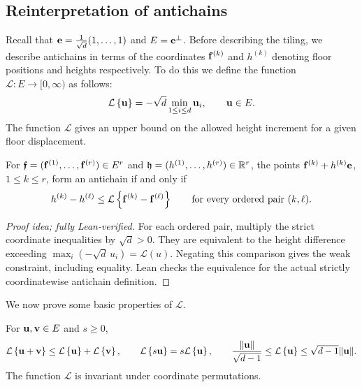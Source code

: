 \documentclass[11pt,letterpaper]{article}
\begin{document}
\subsection{Reinterpretation of antichains}
Recall that $\mathbf e=\frac{1}{\sqrt d}(1,\ldots,1)$ and $E=\mathbf e^\perp$.
Before describing the tiling, we describe antichains in terms of the coordinates $\mathbf f^{(k)}$ and $h^{(k)}$ denoting floor positions and heights respectively. To do this we define the function $\mathcal L:E\to[0,\infty)$ as follows:
\[
      \mathcal L\left\{\mathbf u\right\}=-\sqrt d\min_{1\le i\le d}\mathbf u_i, \qquad  \mathbf u\in E.
\]
The function $\mathcal L$ gives an upper bound on the allowed height increment for a given floor displacement.


\begin{proposition} \label{prop:L_definition}
      For $\bm{\mathfrak f}=(\mathbf f^{(1)},\ldots,\mathbf f^{(r)})\in E^r$ and $\mathfrak h=(h^{(1)},\ldots,h^{(r)})\in\mathbb R^r$, the points $\mathbf f^{(k)}+h^{(k)}\mathbf e$, $1\le k\le r$, form an antichain if and only if
      \begin{equation}\label{eq:constraints}
            h^{(k)}-h^{(\ell)}\le\mathcal L\left\{\mathbf f^{(k)}-\mathbf f^{(\ell)}\right\} \qquad\text{for every ordered pair }(k,\ell).
      \end{equation}
\end{proposition}

\begin{proof}[Proof idea; fully Lean-verified]
For each ordered pair, multiply the strict coordinate inequalities by $\sqrt d>0$. They are equivalent to the height difference exceeding $\max_i(-\sqrt d\,u_i)=\mathcal L(u)$. Negating this comparison gives the weak constraint, including equality. Lean checks the equivalence for the actual strictly coordinatewise antichain definition.
\end{proof}

We now prove some basic properties of $\mathcal L$.

\begin{lemma}
      For $\mathbf u,\mathbf v\in E$ and $s\ge0$,
      \begin{equation}\label{eq:height-bound}
            \mathcal L\left\{\mathbf u+\mathbf v\right\}\le\mathcal L\left\{\mathbf u\right\}+\mathcal L\left\{\mathbf v\right\},\qquad \mathcal L\left\{s\mathbf u\right\}=s\mathcal L\left\{\mathbf u\right\},\qquad \frac{\|\mathbf u\|}{\sqrt{d-1}}\le\mathcal L\left\{\mathbf u\right\} \le\sqrt{d-1}\|\mathbf u\|.
      \end{equation}
      The function $\mathcal L$ is invariant under coordinate permutations.
\end{lemma}
\end{document}
